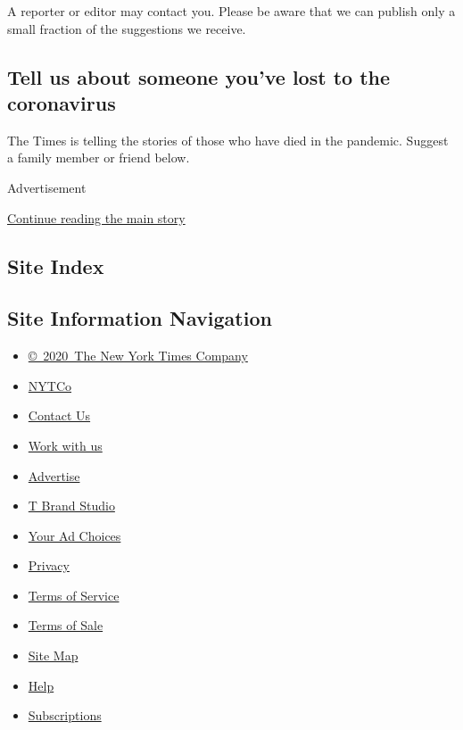 A reporter or editor may contact you. Please be aware that we can
publish only a small fraction of the suggestions we receive.

\hypertarget{tell-us-about-someone-youve-lost-to-the-coronavirus}{%
\subsection{Tell us about someone you've lost to the
coronavirus}\label{tell-us-about-someone-youve-lost-to-the-coronavirus}}

The Times is telling the stories of those who have died in the pandemic.
Suggest a family member or friend below.

Advertisement

\protect\hyperlink{after-bottom}{Continue reading the main story}

\hypertarget{site-index}{%
\subsection{Site Index}\label{site-index}}

\hypertarget{site-information-navigation}{%
\subsection{Site Information
Navigation}\label{site-information-navigation}}

\begin{itemize}
\tightlist
\item
  \href{https://help.nytimes.com/hc/en-us/articles/115014792127-Copyright-notice}{©~2020~The
  New York Times Company}
\end{itemize}

\begin{itemize}
\tightlist
\item
  \href{https://www.nytco.com/}{NYTCo}
\item
  \href{https://help.nytimes.com/hc/en-us/articles/115015385887-Contact-Us}{Contact
  Us}
\item
  \href{https://www.nytco.com/careers/}{Work with us}
\item
  \href{https://nytmediakit.com/}{Advertise}
\item
  \href{http://www.tbrandstudio.com/}{T Brand Studio}
\item
  \href{https://www.nytimes.com/privacy/cookie-policy\#how-do-i-manage-trackers}{Your
  Ad Choices}
\item
  \href{https://www.nytimes.com/privacy}{Privacy}
\item
  \href{https://help.nytimes.com/hc/en-us/articles/115014893428-Terms-of-service}{Terms
  of Service}
\item
  \href{https://help.nytimes.com/hc/en-us/articles/115014893968-Terms-of-sale}{Terms
  of Sale}
\item
  \href{https://spiderbites.nytimes.com}{Site Map}
\item
  \href{https://help.nytimes.com/hc/en-us}{Help}
\item
  \href{https://www.nytimes.com/subscription?campaignId=37WXW}{Subscriptions}
\end{itemize}
